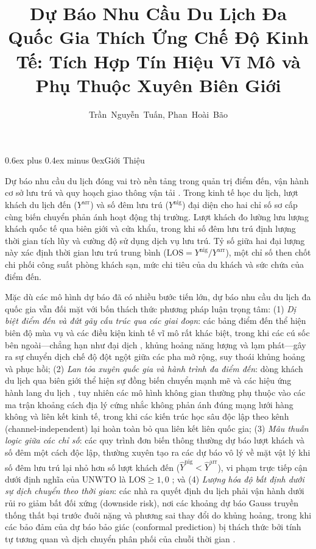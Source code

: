 \documentclass[10pt,journal,compsoc]{IEEEtran}
\title{Dự Báo Nhu Cầu Du Lịch Đa Quốc Gia Thích Ứng Chế Độ Kinh Tế: Tích Hợp Tín Hiệu Vĩ Mô và Phụ Thuộc Xuyên Biên Giới}
\author{Trần~Nguyễn~Tuấn,
        Phan~Hoài~Bão}
\makeatletter
\def\section{\@startsection{section}{1}{\z@}{-2.2ex plus -0.8ex minus -0.4ex}%
{0.6ex plus 0.4ex minus 0ex}{\normalfont\sublargesize\rmfamily\bfseries}}
\makeatother
\begin{document}
\maketitle
\IEEEdisplaynontitleabstractindextext
\IEEEpeerreviewmaketitle

\section{\texorpdfstring{Giới Thiệu}{Gioi Thieu}}

Dự báo nhu cầu du lịch đóng vai trò nền tảng trong quản trị điểm đến, vận hành cơ sở lưu trú và quy hoạch giao thông vận tải \cite{song2019tourism,clements1998forecasting}. Trong kinh tế học du lịch, lượt khách du lịch đến ($Y^{\text{arr}}$) và số đêm lưu trú ($Y^{\text{nig}}$) đại diện cho hai chỉ số sơ cấp cùng biến chuyển phản ánh hoạt động thị trường. Lượt khách đo lường lưu lượng khách quốc tế qua biên giới và cửa khẩu, trong khi số đêm lưu trú định lượng thời gian tích lũy và cường độ sử dụng dịch vụ lưu trú. Tỷ số giữa hai đại lượng này xác định thời gian lưu trú trung bình ($\text{LOS} = Y^{\text{nig}} / Y^{\text{arr}}$), một chỉ số then chốt chi phối công suất phòng khách sạn, mức chi tiêu của du khách và sức chứa của điểm đến.

Mặc dù các mô hình dự báo đã có nhiều bước tiến lớn, dự báo nhu cầu du lịch đa quốc gia vẫn đối mặt với bốn thách thức phương pháp luận trọng tâm: (1) \textit{Dị biệt điểm đến và đứt gãy cấu trúc qua các giai đoạn}: các bảng điểm đến thể hiện biên độ mùa vụ và các điều kiện kinh tế vĩ mô rất khác biệt, trong khi các cú sốc bên ngoài---chẳng hạn như đại dịch \cite{gossling2020pandemics}, khủng hoảng năng lượng và lạm phát---gây ra sự chuyển dịch chế độ đột ngột giữa các pha mở rộng, suy thoái khủng hoảng và phục hồi; (2) \textit{Lan tỏa xuyên quốc gia và hành trình đa điểm đến}: dòng khách du lịch qua biên giới thể hiện sự đồng biến chuyển mạnh mẽ và các hiệu ứng hành lang du lịch \cite{yang2019spatial,cang2014comparative}, tuy nhiên các mô hình không gian thường phụ thuộc vào các ma trận khoảng cách địa lý cứng nhắc không phản ánh đúng mạng lưới hàng không và liên kết kinh tế, trong khi các kiến trúc học sâu độc lập theo kênh (channel-independent) lại hoàn toàn bỏ qua liên kết liên quốc gia; (3) \textit{Mâu thuẫn logic giữa các chỉ số}: các quy trình đơn biến thông thường dự báo lượt khách và số đêm một cách độc lập, thường xuyên tạo ra các dự báo vô lý về mặt vật lý khi số đêm lưu trú lại nhỏ hơn số lượt khách đến ($\hat{Y}^{\text{nig}} < \hat{Y}^{\text{arr}}$), vi phạm trực tiếp cận dưới định nghĩa của UNWTO là $\text{LOS} \ge 1{,}0$ \cite{unwto2010recommendations}; và (4) \textit{Lượng hóa độ bất định dưới sự dịch chuyển theo thời gian}: các nhà ra quyết định du lịch phải vận hành dưới rủi ro giảm bất đối xứng (downside risk), nơi các khoảng dự báo Gauss truyền thống thất bại trước đuôi nặng và phương sai thay đổi do khủng hoảng, trong khi các bảo đảm của dự báo bảo giác (conformal prediction) bị thách thức bởi tính tự tương quan và dịch chuyển phân phối của chuỗi thời gian \cite{barber2023conformal,gibbs2021adaptive}.
\end{document}
